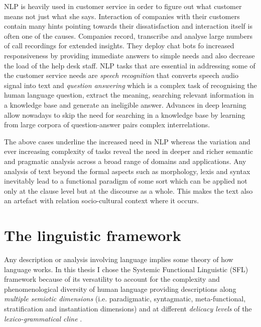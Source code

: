 NLP is heavily used in customer service in order to figure out what customer means not just what she says. Interaction of companies with their customers contain many hints pointing towards their dissatisfaction and interaction itself is often one of the causes. Companies record, transcribe and analyse large numbers of call recordings for extended insights. They deploy chat bots fo increased responsiveness by providing immediate answers to simple needs and also decrease the load of the help desk staff. NLP tasks that are essential in addressing some of the customer service needs are \textit{speech recognition} that converts speech audio signal into text and \textit{question answering} which is a complex task of recognising the human language question, extract the meaning, searching relevant information in a knowledge base and generate an ineligible answer. Advances in deep learning allow nowadays to skip the need for searching in a knowledge base by learning from large corpora of question-answer pairs complex interrelations. 

The above cases underline the increased need in NLP whereas the variation and ever increasing complexity of tasks reveal the need in deeper and richer semantic and pragmatic analysis across a broad range of domains and applications. Any analysis of text beyond the formal aspects such as morphology, lexis and syntax inevitably lead to a functional paradigm of some sort which can be applied not only at the clause level but at the discourse as a whole. This makes the text also an artefact with relation socio-cultural context where it occurs. 

\section{The linguistic framework}
Any description or analysis involving language implies some theory of how language works. In this thesis I chose the Systemic Functional Linguistic (SFL) framework because of its versatility to account for the complexity and phenomenological diversity of human language providing descriptions along \textit{multiple semiotic dimensions} \citep{Halliday2003} (i.e. paradigmatic, syntagmatic, meta-functional, stratification and instantiation dimensions) and at different \textit{delicacy levels} of the \textit{lexico-grammatical cline} \citep{Halliday2002, Hasan2014}. 

